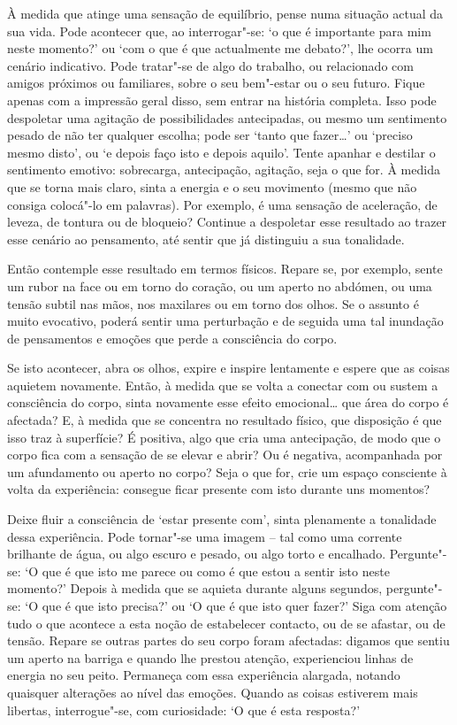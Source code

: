 À medida que atinge uma sensação de equilíbrio, pense numa situação actual da
sua vida. Pode acontecer que, ao interrogar"-se: `o que é importante para mim
neste momento?' ou `com o que é que actualmente me debato?', lhe ocorra um
cenário indicativo. Pode tratar"-se de algo do trabalho, ou relacionado com
amigos próximos ou familiares, sobre o seu bem"-estar ou o seu futuro. Fique
apenas com a impressão geral disso, sem entrar na história completa. Isso pode
despoletar uma agitação de possibilidades antecipadas, ou mesmo um sentimento
pesado de não ter qualquer escolha; pode ser `tanto que fazer\ldots{}' ou
`preciso mesmo disto', ou `e depois faço isto e depois aquilo'. Tente apanhar e
destilar o sentimento emotivo: sobrecarga, antecipação, agitação, seja o que
for. À medida que se torna mais claro, sinta a energia e o seu movimento (mesmo
que não consiga colocá"-lo em palavras). Por exemplo, é uma sensação de
aceleração, de leveza, de tontura ou de bloqueio? Continue a despoletar esse
resultado ao trazer esse cenário ao pensamento, até sentir que já distinguiu a
sua tonalidade.

Então contemple esse resultado em termos físicos. Repare se, por exemplo, sente
um rubor na face ou em torno do coração, ou um aperto no abdómen, ou uma tensão
subtil nas mãos, nos maxilares ou em torno dos olhos. Se o assunto é muito
evocativo, poderá sentir uma perturbação e de seguida uma tal inundação de
pensamentos e emoções que perde a consciência do corpo.

Se isto acontecer, abra os olhos, expire e inspire lentamente e espere que as
coisas aquietem novamente. Então, à medida que se volta a conectar com ou sustem
a consciência do corpo, sinta novamente esse efeito emocional\ldots{} que área
do corpo é afectada? E, à medida que se concentra no resultado físico, que
disposição é que isso traz à superfície? É positiva, algo que cria uma
antecipação, de modo que o corpo fica com a sensação de se elevar e abrir? Ou é
negativa, acompanhada por um afundamento ou aperto no corpo? Seja o que for,
crie um espaço consciente à volta da experiência: consegue ficar presente com
isto durante uns momentos?

Deixe fluir a consciência de `estar presente com', sinta plenamente a tonalidade
dessa experiência. Pode tornar"-se uma imagem -- tal como uma corrente brilhante
de água, ou algo escuro e pesado, ou algo torto e encalhado. Pergunte"-se: `O
que é que isto me parece ou como é que estou a sentir isto neste momento?'
Depois à medida que se aquieta durante alguns segundos, pergunte"-se: `O que é
que isto precisa?' ou `O que é que isto quer fazer?' Siga com atenção tudo o que
acontece a esta noção de estabelecer contacto, ou de se afastar, ou de tensão.
Repare se outras partes do seu corpo foram afectadas: digamos que sentiu um
aperto na barriga e quando lhe prestou atenção, experienciou linhas de energia
no seu peito. Permaneça com essa experiência alargada, notando quaisquer
alterações ao nível das emoções. Quando as coisas estiverem mais libertas,
interrogue"-se, com curiosidade: `O que é esta resposta?'

